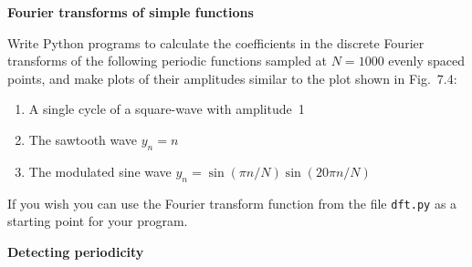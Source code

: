 \documentclass[12pt]{article}
\begin{document}
\par
\bigskip
{}\par
\noindent\hrulefill


\begin{exercises}


\exercise \textbf{Fourier transforms of simple functions}

\exskip Write Python programs to calculate the
coefficients in the discrete Fourier transforms of the following periodic
functions sampled at $N=1000$ evenly spaced points, and make plots of their
amplitudes similar to the plot shown in Fig.~7.4:
\begin{enumerate}\setlength{\itemsep}{0pt}\setlength{\parskip}{0pt}
\item A single cycle of a square-wave with amplitude~1
\item The sawtooth wave $y_n=n$
\item The modulated sine wave $y_n = \sin(\pi n/N) \sin(20\pi n/N)$
\end{enumerate}
If you wish you can use the Fourier transform function from the file
\verb|dft.py| as a starting point for your program.



\exercise \textbf{Detecting periodicity}


\end{exercises}
\end{document}
